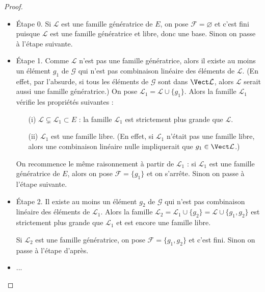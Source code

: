 \documentclass[class=report,crop=false]{standalone}
\begin{document}
\begin{proof}
~
\begin{itemize}
  \item \'Etape 0. Si $\mathcal{L}$ est une famille génératrice de $E$,
  on pose $\mathcal{F} = \varnothing$ et c'est fini puisque
  $\mathcal{L}$ est une famille génératrice et libre, donc une base.
  Sinon on passe à l'étape suivante.

  \item \'Etape 1. Comme $\mathcal{L}$ n'est pas une famille génératrice,
  alors il existe au moins un élément
  $g_1$ de $\mathcal{G}$ qui n'est pas
  combinaison linéaire des éléments de $\mathcal{L}$. (En effet, par l'absurde, si tous les éléments
  de $\mathcal{G}$ sont dans $\Vect \mathcal{L}$, alors $\mathcal{L}$ serait aussi une famille génératrice.)
  On pose $\mathcal{L}_1 = \mathcal{L} \cup \{ g_1 \}$.
    Alors la famille $\mathcal{L}_1$ vérifie les propriétés suivantes :
    \begin{itemize}
      \item[(i)] $\mathcal{L} \subsetneq  \mathcal{L}_1 \subset E$ : la famille
      $\mathcal{L}_1$ est strictement plus grande que $\mathcal{L}$.

      \item[(ii)] $\mathcal{L}_1$ est une famille libre. (En effet, si
      $\mathcal{L}_1$ n'était pas une famille libre, alors une combinaison linéaire nulle impliquerait
      que $g_1 \in \Vect \mathcal{L}$.)
    \end{itemize}

  On recommence le même raisonnement à partir de $\mathcal{L}_1$ :
  si $\mathcal{L}_1$ est une famille génératrice de $E$, alors on pose
  $\mathcal{F} = \{ g_1 \}$ et on s'arrête.
  Sinon on passe à l'étape suivante.

  \item \'Etape 2. Il existe au moins un élément $g_2$ de $\mathcal{G}$
  qui n'est pas combinaison linéaire des éléments de $\mathcal{L}_1$.
  Alors la famille $\mathcal{L}_2 = \mathcal{L}_1 \cup \{g_2\} = \mathcal{L} \cup \{g_1,g_2\}$
  est strictement plus grande que $\mathcal{L}_1$ et est encore une famille libre.

  Si $\mathcal{L}_2$ est une famille génératrice, on pose $\mathcal{F} = \{ g_1, g_2 \}$
  et c'est fini. Sinon on passe à l'étape d'après.

  \item ...

\end{itemize}


\end{proof}
\end{document}
